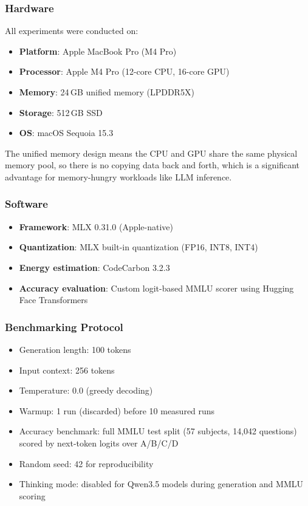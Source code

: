 \documentclass[11pt,a4paper]{article}
\begin{document}
\subsubsection{Hardware}
\label{sec:hw-setup}

All experiments were conducted on:
\begin{itemize}[leftmargin=*,nosep]
    \item \textbf{Platform}: Apple MacBook Pro (M4 Pro)
    \item \textbf{Processor}: Apple M4 Pro (12-core CPU, 16-core GPU)
    \item \textbf{Memory}: 24\,GB unified memory (LPDDR5X)
    \item \textbf{Storage}: 512\,GB SSD
    \item \textbf{OS}: macOS Sequoia 15.3
\end{itemize}

The unified memory design means the CPU and GPU share the same physical memory pool, so there is no copying data back and forth, which is a significant advantage for memory-hungry workloads like LLM inference.

\subsubsection{Software}

\begin{itemize}[leftmargin=*,nosep]
    \item \textbf{Framework}: MLX 0.31.0 (Apple-native)
    \item \textbf{Quantization}: MLX built-in quantization (FP16, INT8, INT4)
    \item \textbf{Energy estimation}: CodeCarbon 3.2.3
    \item \textbf{Accuracy evaluation}: Custom logit-based MMLU scorer using Hugging Face Transformers
\end{itemize}

\subsubsection{Benchmarking Protocol}

\begin{itemize}[leftmargin=*,nosep]
    \item Generation length: 100 tokens
    \item Input context: 256 tokens
    \item Temperature: 0.0 (greedy decoding)
    \item Warmup: 1 run (discarded) before 10 measured runs
    \item Accuracy benchmark: full MMLU test split (57 subjects, 14,042 questions) scored by next-token logits over A/B/C/D
    \item Random seed: 42 for reproducibility
    \item Thinking mode: disabled for Qwen3.5 models during generation and MMLU scoring
\end{itemize}
\end{document}
